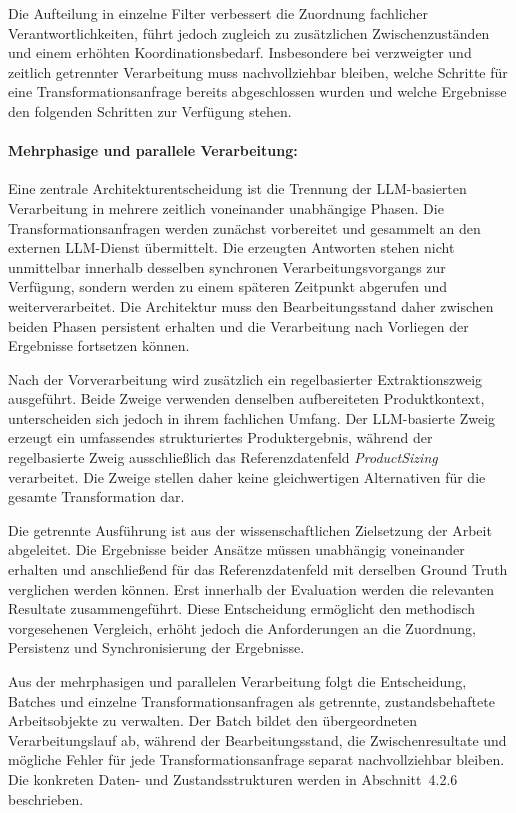 Die Aufteilung in einzelne Filter verbessert die Zuordnung fachlicher Verantwortlichkeiten, führt jedoch zugleich zu zusätzlichen Zwischenzuständen und einem erhöhten 
Koordinationsbedarf. Insbesondere bei verzweigter und zeitlich getrennter Verarbeitung muss nachvollziehbar bleiben, welche Schritte für eine Transformationsanfrage bereits 
abgeschlossen wurden und welche Ergebnisse den folgenden Schritten zur Verfügung stehen.

\paragraph{Mehrphasige und parallele Verarbeitung:}

Eine zentrale Architekturentscheidung ist die Trennung der LLM-basierten Verarbeitung in mehrere zeitlich voneinander unabhängige Phasen. Die Transformationsanfragen werden 
zunächst vorbereitet und gesammelt an den externen LLM-Dienst übermittelt. Die erzeugten Antworten stehen nicht unmittelbar innerhalb desselben synchronen Verarbeitungsvorgangs 
zur Verfügung, sondern werden zu einem späteren Zeitpunkt abgerufen und weiterverarbeitet. Die Architektur muss den Bearbeitungsstand daher zwischen beiden Phasen persistent 
erhalten und die Verarbeitung nach Vorliegen der Ergebnisse fortsetzen können.

Nach der Vorverarbeitung wird zusätzlich ein regelbasierter Extraktionszweig ausgeführt. Beide Zweige verwenden denselben aufbereiteten Produktkontext, unterscheiden sich 
jedoch in ihrem fachlichen Umfang. Der LLM-basierte Zweig erzeugt ein umfassendes strukturiertes Produktergebnis, während der regelbasierte Zweig ausschließlich das 
Referenzdatenfeld \textit{ProductSizing} verarbeitet. Die Zweige stellen daher keine gleichwertigen Alternativen für die gesamte Transformation dar.

Die getrennte Ausführung ist aus der wissenschaftlichen Zielsetzung der Arbeit abgeleitet. Die Ergebnisse beider Ansätze müssen unabhängig voneinander erhalten und 
anschließend für das Referenzdatenfeld mit derselben Ground Truth verglichen werden können. Erst innerhalb der Evaluation werden die relevanten Resultate zusammengeführt. 
Diese Entscheidung ermöglicht den methodisch vorgesehenen Vergleich, erhöht jedoch die Anforderungen an die Zuordnung, Persistenz und Synchronisierung der Ergebnisse.

Aus der mehrphasigen und parallelen Verarbeitung folgt die Entscheidung, Batches und einzelne Transformationsanfragen als getrennte, zustandsbehaftete Arbeitsobjekte zu 
verwalten. Der Batch bildet den übergeordneten Verarbeitungslauf ab, während der Bearbeitungsstand, die Zwischenresultate und mögliche Fehler für jede Transformationsanfrage 
separat nachvollziehbar bleiben. Die konkreten Daten- und Zustandsstrukturen werden in Abschnitt~4.2.6 beschrieben.

